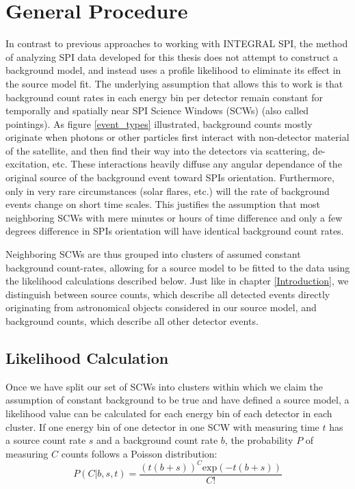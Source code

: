\documentclass{report}
\begin{document}
\section{General Procedure} \label{General Procedure}
In contrast to previous approaches to working with INTEGRAL SPI, the method of analyzing SPI data developed for this thesis does not attempt to construct a background model, and instead uses a profile likelihood to eliminate its effect in the source model fit. The underlying assumption that allows this to work is that background count rates in each energy bin per detector remain constant for temporally and spatially near SPI Science Windows (SCWs) (also called pointings). As figure \ref{event_types} illustrated, background counts mostly originate when photons or other particles first interact with non-detector material of the satellite, and then find their way into the detectors via scattering, de-excitation, etc. These interactions heavily diffuse any angular dependance of the original source of the background event toward SPIs orientation. Furthermore, only in very rare circumstances (solar flares, etc.) will the rate of background events change on short time scales. This justifies the assumption that most neighboring SCWs with mere minutes or hours of time difference and only a few degrees difference in SPIs orientation will have identical background count rates. 

Neighboring SCWs are thus grouped into clusters of assumed constant background count-rates, allowing for a source model to be fitted to the data using the likelihood calculations described below. Just like in chapter \ref{Introduction}, we distinguish between source counts, which describe all detected events directly originating from astronomical objects considered in our source model, and background counts, which describe all other detector events.

\subsection{Likelihood Calculation}

Once we have split our set of SCWs into clusters within which we claim the assumption of constant background to be true and have defined a source model, a likelihood value can be calculated for each energy bin of each detector in each cluster. If one energy bin of one detector in one SCW with measuring time $t$ has a source count rate $s$ and a background count rate $b$, the probability $P$ of measuring $C$ counts follows a Poisson distribution:
\begin{equation}
    P(C \vert b, s, t) = \frac{\left( t \left( b + s \right) \right) ^C \text{exp}\left( -t \left( b+s\right)\right)}{C!}
\end{equation}
\end{document}
